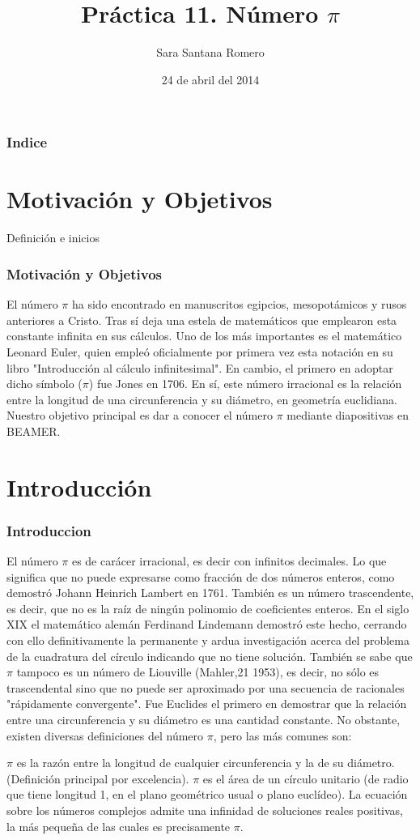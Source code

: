 \documentclass{beamer}
\title[El número $\pi$]{Práctica 11. Número $\pi$}
\author[alu0100827750]{Sara Santana Romero}
\institute{ULL}
\date[24/04/2014]{24 de abril del 2014}
\begin{document}
\begin{frame}
\titlepage
\end{frame}

\begin{frame}
\frametitle{Indice}
\tableofcontents[pausesections]
\end{frame}

\section{Motivación y Objetivos}
\begin{frame}
\begin{block}{Definición e inicios}
\frametitle{Motivación y Objetivos}
El número $\pi$ ha sido encontrado en manuscritos egipcios, mesopotámicos y rusos anteriores a Cristo. Tras sí deja una estela de matemáticos que emplearon esta constante infinita en sus cálculos. Uno de los más importantes es el  matemático Leonard Euler, quien empleó oficialmente por primera vez esta notación en su libro "Introducción al cálculo infinitesimal". En cambio, el primero en adoptar dicho símbolo ($\pi$) fue Jones en 1706.
%
En sí, este número irracional es la relación entre la longitud de una circunferencia y su diámetro, en geometría euclidiana.
%
Nuestro objetivo principal es dar a conocer el número $\pi$ mediante diapositivas en BEAMER. 
\end{block}
\end{frame}
%
\section{Introducción}
\begin{frame}
\frametitle{Introduccion}

El número $\pi$ es de carácer irracional, es decir con infinitos decimales. Lo que significa que no puede expresarse como fracción de dos números enteros, como demostró Johann Heinrich Lambert en 1761. También es un número trascendente, es decir, que no es la raíz de ningún polinomio de coeficientes enteros. En el siglo XIX el matemático alemán Ferdinand Lindemann demostró este hecho, cerrando con ello definitivamente la permanente y ardua investigación acerca del problema de la cuadratura del círculo indicando que no tiene solución.
También se sabe que $\pi$ tampoco es un número de Liouville (Mahler,21 1953), es decir, no sólo es trascendental sino que no puede ser aproximado por una secuencia de racionales "rápidamente convergente".
%
Fue Euclides el primero en demostrar que la relación entre una circunferencia y su diámetro es una cantidad constante. No obstante, existen diversas definiciones del número $\pi$, pero las más comunes son:

$\pi$ es la razón entre la longitud de cualquier circunferencia y la de su diámetro. (Definición principal por excelencia).
$\pi$ es el área de un círculo unitario (de radio que tiene longitud 1, en el plano geométrico usual o plano euclídeo).
La ecuación sobre los números complejos admite una infinidad de soluciones reales positivas, la más pequeña de las cuales es precisamente $\pi$.
\end{frame}
\end{document}
